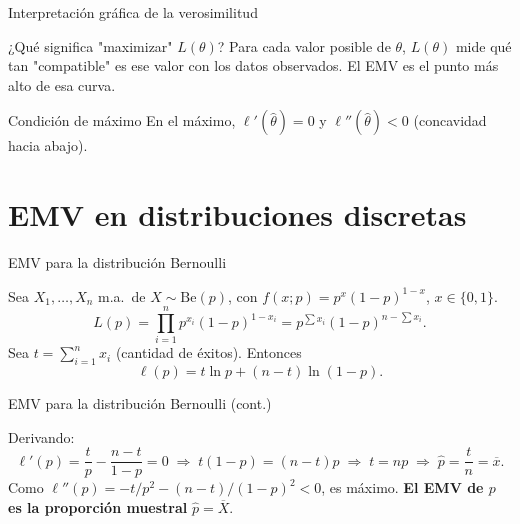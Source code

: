 \documentclass[aspectratio=169,11pt]{beamer}
\begin{document}
\begin{frame}{Interpretación gráfica de la verosimilitud}
\begin{block}{¿Qué significa "maximizar" $L(\theta)$?}
Para cada valor posible de $\theta$, $L(\theta)$ mide qué tan "compatible" es ese valor con los datos observados. El EMV es el punto más alto de esa curva.
\end{block}
\begin{center}
\end{center}
\begin{alertblock}{Condición de máximo}
En el máximo, $\ell'(\widehat\theta)=0$ y $\ell''(\widehat\theta)<0$ (concavidad hacia abajo).
\end{alertblock}
\end{frame}

\section{EMV en distribuciones discretas}

\begin{frame}{EMV para la distribución Bernoulli}
\begin{example}
Sea $X_1,\dots,X_n$ m.a.\ de $X\sim \text{Be}(p)$, con $f(x;p) = p^x(1-p)^{1-x}$, $x\in\{0,1\}$.
\[
L(p) = \prod_{i=1}^n p^{x_i}(1-p)^{1-x_i} = p^{\sum x_i}(1-p)^{n-\sum x_i}.
\]
Sea $t=\sum_{i=1}^n x_i$ (cantidad de éxitos). Entonces
\[
\ell(p) = t\ln p + (n-t)\ln(1-p).
\]
\end{example}
\end{frame}

\begin{frame}{EMV para la distribución Bernoulli (cont.)}
\begin{example}
Derivando:
\[
\ell'(p) = \frac{t}{p} - \frac{n-t}{1-p} = 0 \;\Longrightarrow\; t(1-p) = (n-t)p \;\Longrightarrow\; t = np \;\Longrightarrow\; \widehat p = \frac{t}{n} = \overline x.
\]
Como $\ell''(p) = -t/p^2 - (n-t)/(1-p)^2 < 0$, es máximo. \textbf{El EMV de $p$ es la proporción muestral} $\widehat p = \overline X$.
\end{example}
\end{frame}
\end{document}
